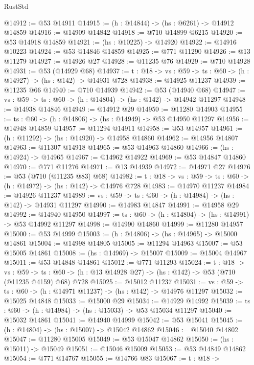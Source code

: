 \begin{lexlean}{RustStd}
\begin{coremodule}
@14912 := @53 @14911
@14915 := (h : @14844) -> (hs : @6261) -> @14912 @14859
@14916 := @14909 @14842
@14918 := @710 @14899 @6215
@14920 := @53 @14918 @14859
@14921 := (hs : @10225) -> @14920
@14922 := @14916 @10223
@14924 := @53 @14846 @14859
@14925 := @771 @11290
@14926 := @13 @11279
@14927 := @14926 @27
@14928 := @11235 @76
@14929 := @710 @14928
@14931 := @53 (@14929 @68)
@14937 := {t : @18} -> {vs : @59} -> {ts : @60} -> (h : @14927) -> (hs : @142) -> @14931 @728
@14938 := @14925 @11237
@14939 := @11235 @66
@14940 := @710 @14939
@14942 := @53 (@14940 @68)
@14947 := {vs : @59} -> {ts : @60} -> (h : @14804) -> (hs : @142) -> @14942 @11297
@14948 := @14938 @14846
@14949 := @14912 @29
@14950 := @11280 @14903
@14955 := {ts : @60} -> (h : @14806) -> (hs : @14949) -> @53 @14950 @11297
@14956 := @14948 @14859
@14957 := @11294 @14911
@14958 := @53 @14957
@14961 := (h : @11292) -> (hs : @14920) -> @14958 @14860
@14962 := @14956 @14807
@14963 := @11307 @14918
@14965 := @53 @14963 @14860
@14966 := (hs : @14924) -> @14965
@14967 := @14962 @14922
@14969 := @53 @14847 @14860
@14970 := @771 @11276
@14971 := @13 @14939
@14972 := @14971 @27
@14976 := @53 (@710 (@11235 @83) @68)
@14982 := {t : @18} -> {vs : @59} -> {ts : @60} -> (h : @14972) -> (hs : @142) -> @14976 @728
@14983 := @14970 @11237
@14984 := @14926 @11237
@14989 := {vs : @59} -> {ts : @60} -> (h : @14984) -> (hs : @142) -> @14931 @11297
@14990 := @14983 @14847
@14991 := @14958 @29
@14992 := @14940 @14950
@14997 := {ts : @60} -> (h : @14804) -> (hs : @14991) -> @53 @14992 @11297
@14998 := @14990 @14860
@14999 := @11280 @14957
@15000 := @53 @14999
@15003 := (h : @14806) -> (hs : @14965) -> @15000 @14861
@15004 := @14998 @14805
@15005 := @11294 @14963
@15007 := @53 @15005 @14861
@15008 := (hs : @14969) -> @15007
@15009 := @15004 @14967
@15011 := @53 @14848 @14861
@15012 := @771 @11293
@15024 := {t : @18} ->
  {vs : @59} ->
  {ts : @60} -> (h : @13 @14928 @27) -> (hs : @142) -> @53 (@710 (@11235 @4159) @68) @728
@15025 := @15012 @11237
@15031 := {vs : @59} -> {ts : @60} -> (h : @14971 @11237) -> (hs : @142) -> @14976 @11297
@15032 := @15025 @14848
@15033 := @15000 @29
@15034 := @14929 @14992
@15039 := {ts : @60} -> (h : @14984) -> (hs : @15033) -> @53 @15034 @11297
@15040 := @15032 @14861
@15041 := @14940 @14999
@15042 := @53 @15041
@15045 := (h : @14804) -> (hs : @15007) -> @15042 @14862
@15046 := @15040 @14802
@15047 := @11280 @15005
@15049 := @53 @15047 @14862
@15050 := (hs : @15011) -> @15049
@15051 := @15046 @15009
@15053 := @53 @14849 @14862
@15054 := @771 @14767
@15055 := @14766 @83
@15067 := {t : @18} ->

\end{coremodule}
\end{lexlean}

